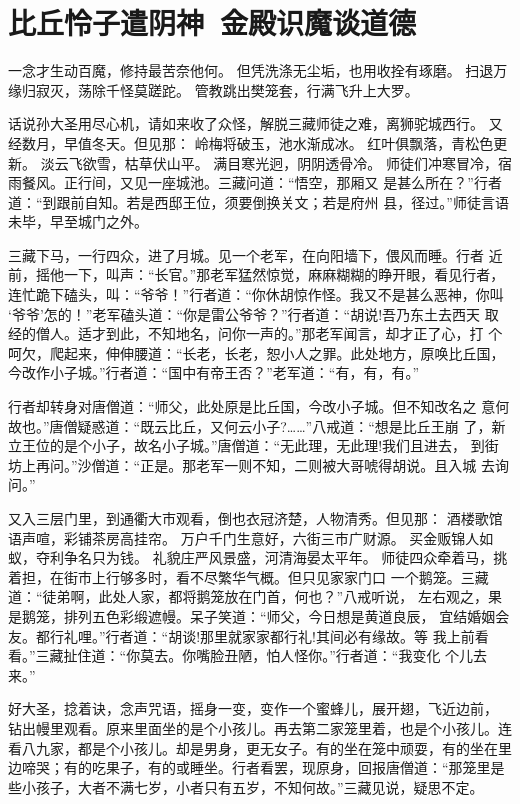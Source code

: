 \chapter{比丘怜子遣阴神~金殿识魔谈道德}

一念才生动百魔，修持最苦奈他何。
但凭洗涤无尘垢，也用收拴有琢磨。
扫退万缘归寂灭，荡除千怪莫蹉跎。
管教跳出樊笼套，行满飞升上大罗。

话说孙大圣用尽心机，请如来收了众怪，解脱三藏师徒之难，离狮驼城西行。
又经数月，早值冬天。但见那：
岭梅将破玉，池水渐成冰。
红叶俱飘落，青松色更新。
淡云飞欲雪，枯草伏山平。
满目寒光迥，阴阴透骨冷。
师徒们冲寒冒冷，宿雨餐风。正行间，又见一座城池。三藏问道：“悟空，那厢又
是甚么所在？”行者道：“到跟前自知。若是西邸王位，须要倒换关文；若是府州
县，径过。”师徒言语未毕，早至城门之外。

三藏下马，一行四众，进了月城。见一个老军，在向阳墙下，偎风而睡。行者
近前，摇他一下，叫声：“长官。”那老军猛然惊觉，麻麻糊糊的睁开眼，看见行者，
连忙跪下磕头，叫：“爷爷！”行者道：“你休胡惊作怪。我又不是甚么恶神，你叫
‘爷爷’怎的！”老军磕头道：“你是雷公爷爷？”行者道：“胡说!吾乃东土去西天
取经的僧人。适才到此，不知地名，问你一声的。”那老军闻言，却才正了心，打
个呵欠，爬起来，伸伸腰道：“长老，长老，恕小人之罪。此处地方，原唤比丘国，
今改作小子城。”行者道：“国中有帝王否？”老军道：“有，有，有。”

行者却转身对唐僧道：“师父，此处原是比丘国，今改小子城。但不知改名之
意何故也。”唐僧疑惑道：“既云比丘，又何云小子?……”八戒道：“想是比丘王崩
了，新立王位的是个小子，故名小子城。”唐僧道：“无此理，无此理!我们且进去，
到街坊上再问。”沙僧道：“正是。那老军一则不知，二则被大哥唬得胡说。且入城
去询问。”

又入三层门里，到通衢大市观看，倒也衣冠济楚，人物清秀。但见那：
酒楼歌馆语声喧，彩铺茶房高挂帘。
万户千门生意好，六街三市广财源。
买金贩锦人如蚁，夺利争名只为钱。
礼貌庄严风景盛，河清海晏太平年。
师徒四众牵着马，挑着担，在街市上行够多时，看不尽繁华气概。但只见家家门口
一个鹅笼。三藏道：“徒弟啊，此处人家，都将鹅笼放在门首，何也？”八戒听说，
左右观之，果是鹅笼，排列五色彩缎遮幔。呆子笑道：“师父，今日想是黄道良辰，
宜结婚姻会友。都行礼哩。”行者道：“胡谈!那里就家家都行礼!其间必有缘故。等
我上前看看。”三藏扯住道：“你莫去。你嘴脸丑陋，怕人怪你。”行者道：“我变化
个儿去来。”

好大圣，捻着诀，念声咒语，摇身一变，变作一个蜜蜂儿，展开翅，飞近边前，
钻出幔里观看。原来里面坐的是个小孩儿。再去第二家笼里着，也是个小孩儿。连
看八九家，都是个小孩儿。却是男身，更无女子。有的坐在笼中顽耍，有的坐在里
边啼哭；有的吃果子，有的或睡坐。行者看罢，现原身，回报唐僧道：“那笼里是
些小孩子，大者不满七岁，小者只有五岁，不知何故。”三藏见说，疑思不定。

